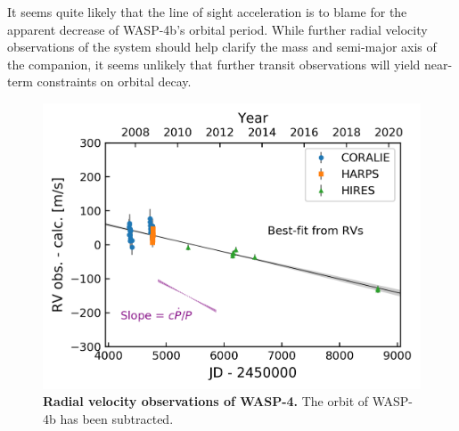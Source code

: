 \documentclass[RNAAS]{aastex62}
\begin{document}
It seems quite likely that the line of sight acceleration is to blame
for the apparent decrease of WASP-4b's orbital period.  While further
radial velocity observations of the system should help clarify the
mass and semi-major axis of the companion, it seems unlikely that
further transit observations will yield near-term constraints on
orbital decay.



\begin{figure}
    \begin{center}
		\includegraphics{20190716_rv_fit.png}
    \end{center}
    \vspace{-0.8cm}
    \caption{
      {\bf Radial velocity observations of WASP-4.}
      The orbit of WASP-4b has been subtracted.
       \label{fig:rv_o_minus_c}
    }
\end{figure}


\acknowledgements
\end{document}
